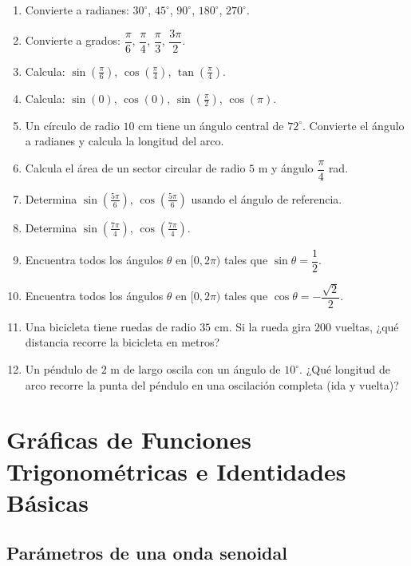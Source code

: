\documentclass[12pt, a4paper]{article}
\begin{document}
  \begin{enumerate}[leftmargin=*, resume]
    \item \facil{} Convierte a radianes: $30^\circ$, $45^\circ$, $90^\circ$, $180^\circ$, $270^\circ$.
    \item \facil{} Convierte a grados: $\dfrac{\pi}{6}$, $\dfrac{\pi}{4}$, $\dfrac{\pi}{3}$, $\dfrac{3\pi}{2}$.
    \item \facil{} Calcula: $\sin\left(\frac{\pi}{6}\right)$, $\cos\left(\frac{\pi}{4}\right)$, $\tan\left(\frac{\pi}{4}\right)$.
    \item \facil{} Calcula: $\sin(0)$, $\cos(0)$, $\sin\left(\frac{\pi}{2}\right)$, $\cos(\pi)$.
    \item \medio{} Un círculo de radio $10$ cm tiene un ángulo central de $72^\circ$. Convierte el ángulo a radianes y calcula la longitud del arco.
    \item \medio{} Calcula el área de un sector circular de radio $5$ m y ángulo $\dfrac{\pi}{4}$ rad.
    \item \medio{} Determina $\sin\left(\frac{5\pi}{6}\right)$, $\cos\left(\frac{5\pi}{6}\right)$ usando el ángulo de referencia.
    \item \medio{} Determina $\sin\left(\frac{7\pi}{4}\right)$, $\cos\left(\frac{7\pi}{4}\right)$.
    \item \dificil{} Encuentra todos los ángulos $\theta$ en $[0, 2\pi)$ tales que $\sin\theta = \dfrac{1}{2}$.
    \item \dificil{} Encuentra todos los ángulos $\theta$ en $[0, 2\pi)$ tales que $\cos\theta = -\dfrac{\sqrt{2}}{2}$.
    \item \dificil{} Una bicicleta tiene ruedas de radio $35$ cm. Si la rueda gira $200$ vueltas, ¿qué distancia recorre la bicicleta en metros?
    \item \dificil{} Un péndulo de $2$ m de largo oscila con un ángulo de $10^\circ$. ¿Qué longitud de arco recorre la punta del péndulo en una oscilación completa (ida y vuelta)?
  \end{enumerate}

  \newpage

  \section{Gráficas de Funciones Trigonométricas e Identidades Básicas}

  \subsection{Parámetros de una onda senoidal}
\end{document}
